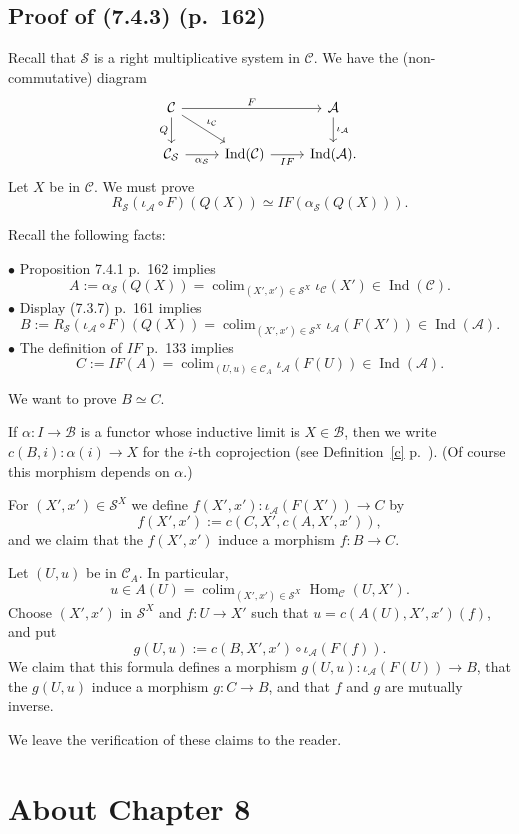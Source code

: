 \documentclass[12pt]{article}
\theoremstyle{remark}
\theoremstyle{definition}
\newcommand{\bu}{\bullet}
\newcommand{\A}{\mathcal A}
\newcommand{\B}{\mathcal B}
\newcommand{\C}{\mathcal C}
\newcommand{\SSS}{\mathcal S}
\newcommand{\cn}{(See (\ref{convnot}) p.~\pageref{convnot} for an explanation of the notation.) }%
\DeclareMathOperator*{\coli}{colim}
\DeclareMathOperator*{\co}{colim}
\DeclareMathOperator{\Hom}{Hom}%
\DeclareMathOperator{\Ind}{Ind}
\begin{document}
\subsection{Proof of (7.4.3) (p.~162)} %
%
Recall that $\SSS$ is a right multiplicative system in $\C$. We have the (non-commutative) diagram
$$
\begin{tikzcd}
\C\ar{rr}{F}\ar{d}[swap]{Q}\ar{dr}{\iota_\C}&&\A\ar{d}{\iota_\A}\\ 
\C_\SSS\ar{r}[swap]{\alpha_\SSS}&\Ind(\C)\ar{r}[swap]{IF}&\Ind(\A).
\end{tikzcd}
$$
Let $X$ be in $\C$. We must prove 
$$
R_\SSS(\iota_\A\circ F)(Q(X))\simeq IF(\alpha_\SSS(Q(X))).
$$

Recall the following facts: 

\noindent$\bu$ Proposition 7.4.1 p.~162 implies
$$
A:=\alpha_\SSS(Q(X))=\coli_{(X',x')\in\SSS^X}\iota_\C(X')\in\Ind(\C).
$$ 
$\bu$ Display (7.3.7) p.~161 implies
$$
B:=R_\SSS(\iota_\A\circ F)(Q(X))=\coli_{(X',x')\in\SSS^X}\iota_\A(F(X'))\in\Ind(\A).
$$
$\bu$ The definition of $IF$ p.~133 implies
$$
C:=IF(A)=\coli_{(U,u)\in\C_A}\iota_\A(F(U))\in\Ind(\A).
$$ 

We want to prove $B\simeq C$.

 If $\alpha:I\to\B$ is a functor whose inductive limit is $X\in\B$, then we write $c(B,i):\alpha(i)\to X$ for the $i$-th coprojection (see Definition~\ref{c} p.~\pageref{c}). (Of course this morphism depends on $\alpha$.) 

For $(X',x')\in\SSS^X$ we define $f(X',x'):\iota_\A(F(X'))\to C$ by 
$$
f(X',x'):=c(C,X',c(A,X',x')),
$$ 
and we claim that the $f(X',x')$ induce a morphism $f:B\to C$. 

Let $(U,u)$ be in $\C_A$. In particular, 
$$
u\in A(U)=\co_{(X',x')\in\SSS^X}\Hom_\C(U,X').
$$ 
Choose $(X',x')$ in $\SSS^X$ and $f:U\to X'$ such that $u=c(A(U),X',x')(f)$, and put 
$$
g(U,u):=c(B,X',x')\circ\iota_\A(F(f)).
$$ 
We claim that this formula defines a morphism $g(U,u):\iota_\A(F(U))\to B$, that the $g(U,u)$ induce a morphism $g:C\to B$, and that $f$ and $g$ are mutually inverse. 

We leave the verification of these claims to the reader. 
%
%
\section{About Chapter 8}
%
\end{document}
